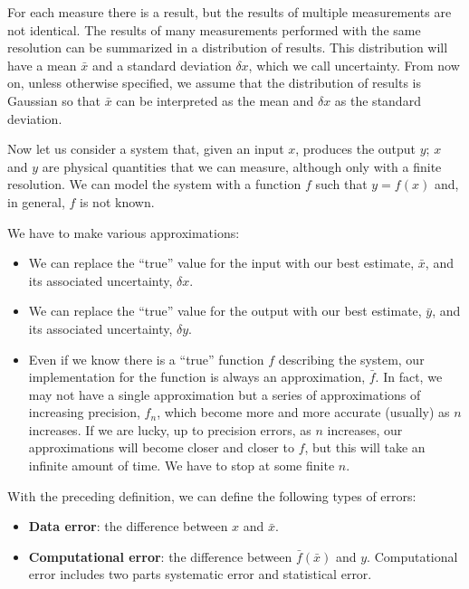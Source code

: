 \documentclass[justified,sixbynine]{tufte-book}
\theoremstyle{plain}%
\theoremstyle{definition}
\theoremstyle{remark}
\begin{document}
\begin{fullwidth}
For each measure there is a result, but the results of multiple measurements are not identical. The results of many measurements performed with the same resolution can be summarized in a distribution of results. This distribution will have a mean $\bar x$ and a standard deviation $\delta x$, which we call uncertainty. From now on, unless otherwise specified, we assume that the distribution of results is Gaussian so that $\bar x$ can be interpreted as the mean and $\delta x$ as the standard deviation.

Now let us consider a system that, given an input $x$, produces the output $y$; $x$ and $y$ are physical quantities that we can measure, although only with a finite resolution. We can model the system with a function $f$ such that $y = f(x)$ and, in general, $f$ is not known.

We have to make various approximations:
\begin{itemize}
\item We can replace the ``true'' value for the input with our best estimate, $\bar x$, and its associated uncertainty, $\delta x$.

\item We can replace the ``true'' value for the output with our best estimate, $\bar y$, and its associated uncertainty, $\delta y$.

\item Even if we know there is a ``true'' function $f$ describing the system, our implementation for the function is always an approximation, $\bar f$. In fact,  we may not have a single approximation but a series of approximations of increasing precision, $f_n$, which become more and more accurate (usually) as $n$ increases. If we are lucky, up to precision errors, as $n$ increases, our approximations will become closer and closer to $f$, but this will take an infinite amount of time. We have to stop at some finite $n$.
\end{itemize}


With the preceding definition, we can define the following types of errors:

\begin{itemize}
\item {\bf Data error}: the difference between $x$ and $\bar x$.

\item {\bf Computational error}: the difference between $\bar f(\bar x)$ and $y$.
Computational error includes two parts systematic error and statistical error.


\end{itemize}
\end{fullwidth}
\end{document}
